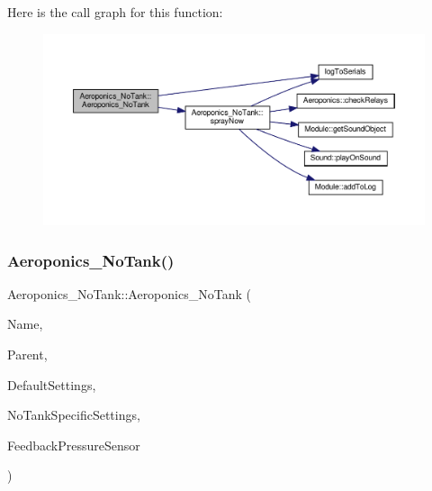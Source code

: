Here is the call graph for this function\+:
\nopagebreak
\begin{figure}[H]
\begin{center}
\leavevmode
\includegraphics[width=350pt]{class_aeroponics___no_tank_aa46529f5e83970d7579a7d524ea65ab7_cgraph}
\end{center}
\end{figure}
\mbox{\label{class_aeroponics___no_tank_aa46529f5e83970d7579a7d524ea65ab7}} 
\subsubsection{\texorpdfstring{Aeroponics\+\_\+\+No\+Tank()}{Aeroponics\_NoTank()}\hspace{0.1cm}{\footnotesize\ttfamily [2/2]}}
{\footnotesize\ttfamily Aeroponics\+\_\+\+No\+Tank\+::\+Aeroponics\+\_\+\+No\+Tank (\begin{DoxyParamCaption}\item[{const \+\_\+\+\_\+\+Flash\+String\+Helper $\ast$}]{Name,  }\item[{\hyperlink{class_module}{Module} $\ast$}]{Parent,  }\item[{\hyperlink{struct_settings_1_1_aeroponics_settings}{Settings\+::\+Aeroponics\+Settings} $\ast$}]{Default\+Settings,  }\item[{\hyperlink{struct_settings_1_1_aeroponics_settings___no_tank_specific}{Settings\+::\+Aeroponics\+Settings\+\_\+\+No\+Tank\+Specific} $\ast$}]{No\+Tank\+Specific\+Settings,  }\item[{\hyperlink{class_pressure_sensor}{Pressure\+Sensor} $\ast$}]{Feedback\+Pressure\+Sensor }\end{DoxyParamCaption})}



